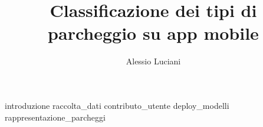 \documentclass[binding=0.6cm,TFA]{sapthesis}
\title{Classificazione dei tipi di parcheggio su app mobile} \author{Alessio Luciani}
\begin{document}
\frontmatter
\maketitle
\dedication{Alla mia famiglia}
\tableofcontents
\mainmatter
\large
{introduzione}
{raccolta_dati}
{contributo_utente}
{deploy_modelli}
{rappresentazione_parcheggi}
\backmatter
\cleardoublepage
{} %
\end{document}
